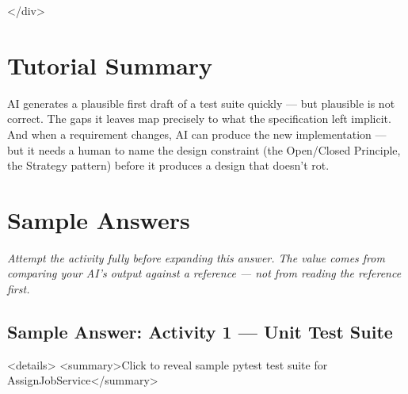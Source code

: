 \documentclass[11pt,a4paper]{book}
\begin{document}
</div>

\medskip

\section{Tutorial Summary}

AI generates a plausible first draft of a test suite quickly --- but plausible is not correct. The gaps it leaves map precisely to what the specification left implicit. And when a requirement changes, AI can produce the new implementation --- but it needs a human to name the design constraint (the Open/Closed Principle, the Strategy pattern) before it produces a design that doesn't rot.

\medskip

\section{Sample Answers}

\textit{Attempt the activity fully before expanding this answer. The value comes from comparing your AI's output against a reference --- not from reading the reference first.}

\medskip

\subsection{Sample Answer: Activity 1 --- Unit Test Suite}

<details>
<summary>Click to reveal sample pytest test suite for AssignJobService</summary>
\end{document}
